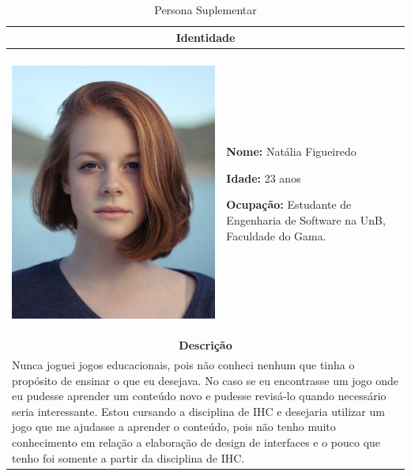 
\begin{table}[htbp]
\centering
\caption{Persona Suplementar}
\label{tab:Table_persona3}
\small
\begin{tabular}{| m{} m{}|}
\hline \multicolumn{2}{|c|}{\textbf{Identidade}} \\ \hline
& \\

\begin{center} \includegraphics[scale=0.06]{figuras/personas/girl-919048_1920.jpg} \end{center} 

&

\textbf{Nome: }  Natália Figueiredo

\textbf{Idade:} 23 anos

\textbf{Ocupação:} Estudante de Engenharia de Software na UnB, Faculdade do Gama.

\\ \hline


\multicolumn{2}{|c|}{\textbf{Descrição}} \\ \hline
\multicolumn{2}{|p{15cm}|}{
        Nunca joguei jogos educacionais, pois não conheci nenhum que tinha o propósito de ensinar o que eu desejava. No caso se eu encontrasse um jogo onde eu pudesse aprender um conteúdo novo e pudesse revisá-lo quando necessário seria interessante. Estou cursando a disciplina de IHC e desejaria utilizar um jogo que me ajudasse a aprender o conteúdo, pois não tenho muito conhecimento em relação a elaboração de design de interfaces e o pouco que tenho foi somente a partir da disciplina de IHC.
        
}
\end{tabular}
\end{table}
